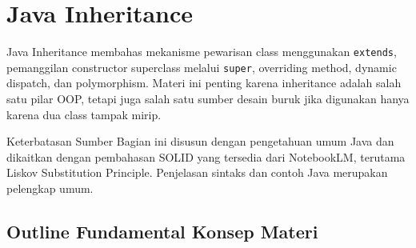 \section{Java Inheritance}

Java Inheritance membahas mekanisme pewarisan class menggunakan \texttt{extends}, pemanggilan constructor superclass melalui \texttt{super}, overriding method, dynamic dispatch, dan polymorphism. Materi ini penting karena inheritance adalah salah satu pilar OOP, tetapi juga salah satu sumber desain buruk jika digunakan hanya karena dua class tampak mirip.

\begin{cmt}{Keterbatasan Sumber}{}
Bagian ini disusun dengan pengetahuan umum Java dan dikaitkan dengan pembahasan SOLID yang tersedia dari NotebookLM, terutama Liskov Substitution Principle. Penjelasan sintaks dan contoh Java merupakan pelengkap umum.
\end{cmt}

\subsection{Outline Fundamental Konsep Materi}

